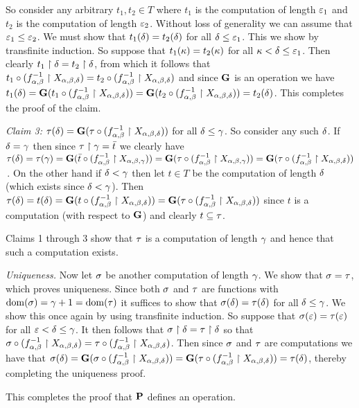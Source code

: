 \begin{solution}
    So consider any arbitrary $t_1, t_2 \in T$ where $t_1$ is the computation of length $\e_1$ and $t_2$ is the computation of length $\e_2$.
    Without loss of generality we can assume that $\e_1 \leq \e_2$.
    We must show that $t_1(\d) = t_2(\d)$ for all $\d \leq \e_1$.
    This we show by transfinite induction.
    So suppose that $t_1(\k) = t_2(\k)$ for all $\k < \d \leq \e_1$.
    Then clearly $t_1 \rest \d = t_2 \rest \d$, from which it follows that $t_1 \circ (\inv{f_{\a,\b}} \rest X_{\a,\b,\d}) = t_2 \circ (\inv{f_{\a,\b}} \rest X_{\a,\b,\d})$ and since $\G$ is an operation we have $t_1(\d) = \G(t_1 \circ (\inv{f_{\a,\b}} \rest X_{\a,\b,\d})) = \G(t_2 \circ (\inv{f_{\a,\b}} \rest X_{\a,\b,\d})) = t_2(\d)$.
    This completes the proof of the claim.

    \emph{Claim 3:} $\t(\d) = \G(\t \circ (\inv{f_{\a,\b}} \rest X_{\a,\b,\d}))$ for all $\d \leq \g$.
    So consider any such $\d$.
    If $\d = \g$ then since $\t \rest \g = \bar{t}$ we clearly have $\t(\d) = \t(\g) = \G(\bar{t} \circ (\inv{f_{\a,\b}} \rest X_{\a,\b,\g})) = \G(\t \circ (\inv{f_{\a,\b}} \rest X_{\a,\b,\g})) = \G(\t \circ (\inv{f_{\a,\b}} \rest X_{\a,\b,\d}))$\,.
    On the other hand if $\d < \g$ then let $t \in T$ be the computation of length $\d$ (which exists since $\d < \g$).
    Then $\t(\d) = t(\d) = \G(t \circ (\inv{f_{\a,\b}} \rest X_{\a,\b,\d})) = \G(\t \circ (\inv{f_{\a,\b}} \rest X_{\a,\b,\d}))$ since $t$ is a computation (with respect to $\G$) and clearly $t \ss \t$.

    Claims 1 through 3 show that $\t$ is a computation of length $\g$ and hence that such a computation exists.

    \emph{Uniqueness.} Now let $\s$ be another computation of length $\g$.
    We show that $\s = \t$, which proves uniqueness.
    Since both $\s$ and $\t$ are functions with $\dom(\s) = \g+1 = \dom(\t)$ it suffices to show that $\s(\d) = \t(\d)$ for all $\d \leq \g$.
    We show this once again by using transfinite induction.
    So suppose that $\s(\e) = \t(\e)$ for all $\e < \d \leq \g$.
    It then follows that $\s \rest \d = \t \rest \d$ so that $\s \circ (\inv{f_{\a,\b}} \rest X_{\a,\b,\d}) = \t \circ (\inv{f_{\a,\b}} \rest X_{\a,\b,\d})$.
    Then since $\s$ and $\t$ are computations we have that $\s(\d) = \G(\s \circ (\inv{f_{\a,\b}} \rest X_{\a,\b,\d})) = \G(\t \circ (\inv{f_{\a,\b}} \rest X_{\a,\b,\d})) = \t(\d)$, thereby completing the uniqueness proof.

    This completes the proof that $\P$ defines an operation.


\end{solution}
